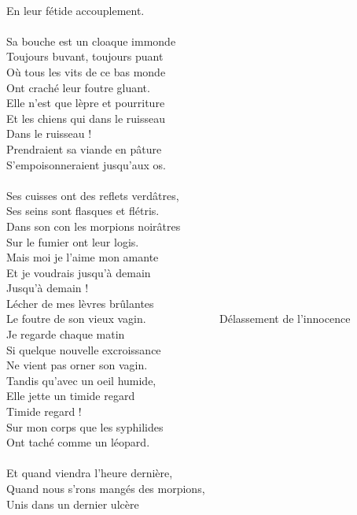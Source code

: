 \\En leur fétide accouplement. ~~~~~~~~~~~~\bissimple
\\\\Sa bouche est un cloaque immonde
\\Toujours buvant, toujours puant
\\Où tous les vits de ce bas monde
\\Ont craché leur foutre gluant.
\\Elle n'est que lèpre et pourriture
\\Et les chiens qui dans le ruisseau
\\Dans le ruisseau !
\\Prendraient sa viande en pâture
\\S'empoisonneraient jusqu'aux os. ~~~~~~\bissimple
\\\\Ses cuisses ont des reflets verdâtres,
\\Ses seins sont flasques et flétris.
\\Dans son con les morpions noirâtres
\\Sur le fumier ont leur logis.
\\Mais moi je l'aime mon amante
\\Et je voudrais jusqu'à demain
\\Jusqu'à demain !
\\Lécher de mes lèvres brûlantes
\\Le foutre de son vieux vagin. ~~~~~~~~~~~~\bissimple
\breakpage
Délassement de l'innocence
\\Je regarde chaque matin
\\Si quelque nouvelle excroissance
\\Ne vient pas orner son vagin.
\\Tandis qu'avec un oeil humide,
\\Elle jette un timide regard
\\Timide regard !
\\Sur mon corps que les syphilides
\\Ont taché comme un léopard. ~~~~~~~~~~~\bissimple
\\\\Et quand viendra l'heure dernière,
\\Quand nous s'rons mangés des morpions,
\\Unis dans un dernier ulcère
